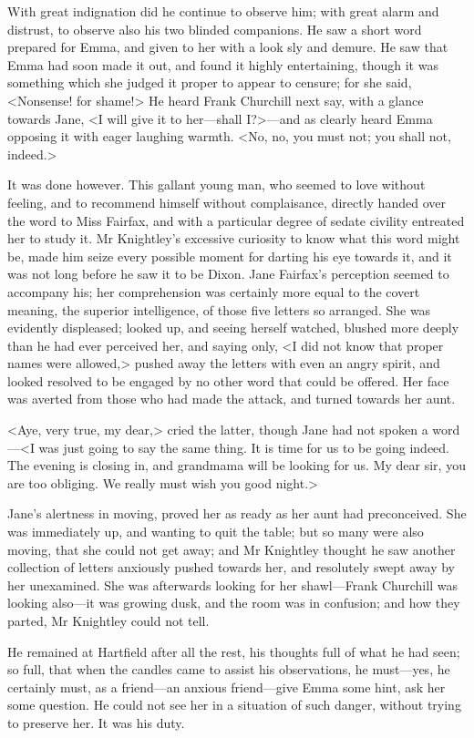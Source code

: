 With great indignation did he continue to observe him; with great alarm and distrust, to observe also his two blinded companions. He saw a short word prepared for Emma, and given to her with a look sly and demure. He saw that Emma had soon made it out, and found it highly entertaining, though it was something which she judged it proper to appear to censure; for she said, <Nonsense! for shame!> He heard Frank Churchill next say, with a glance towards Jane, <I will give it to her—shall I?>—and as clearly heard Emma opposing it with eager laughing warmth. <No, no, you must not; you shall not, indeed.>

It was done however. This gallant young man, who seemed to love without feeling, and to recommend himself without complaisance, directly handed over the word to Miss Fairfax, and with a particular degree of sedate civility entreated her to study it. Mr Knightley's excessive curiosity to know what this word might be, made him seize every possible moment for darting his eye towards it, and it was not long before he saw it to be Dixon. Jane Fairfax's perception seemed to accompany his; her comprehension was certainly more equal to the covert meaning, the superior intelligence, of those five letters so arranged. She was evidently displeased; looked up, and seeing herself watched, blushed more deeply than he had ever perceived her, and saying only, <I did not know that proper names were allowed,> pushed away the letters with even an angry spirit, and looked resolved to be engaged by no other word that could be offered. Her face was averted from those who had made the attack, and turned towards her aunt.

<Aye, very true, my dear,> cried the latter, though Jane had not spoken a word—<I was just going to say the same thing. It is time for us to be going indeed. The evening is closing in, and grandmama will be looking for us. My dear sir, you are too obliging. We really must wish you good night.>

Jane's alertness in moving, proved her as ready as her aunt had preconceived. She was immediately up, and wanting to quit the table; but so many were also moving, that she could not get away; and Mr Knightley thought he saw another collection of letters anxiously pushed towards her, and resolutely swept away by her unexamined. She was afterwards looking for her shawl—Frank Churchill was looking also—it was growing dusk, and the room was in confusion; and how they parted, Mr Knightley could not tell.

He remained at Hartfield after all the rest, his thoughts full of what he had seen; so full, that when the candles came to assist his observations, he must—yes, he certainly must, as a friend—an anxious friend—give Emma some hint, ask her some question. He could not see her in a situation of such danger, without trying to preserve her. It was his duty.

